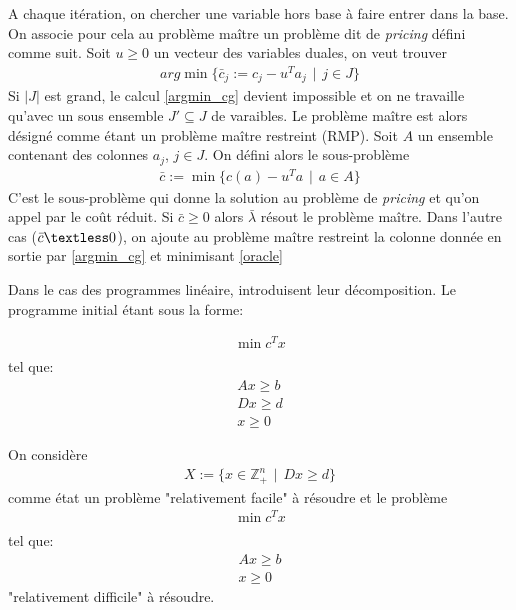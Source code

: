 \documentclass[12pt,a4paper,oneside]{book}
\theoremstyle{definition}
\newcommand{\Z}{\mathbb{Z}}
\begin{document}
			 A chaque itération, on chercher une variable hors base à faire entrer dans la base. On associe pour cela au problème maître un problème dit de \textit{pricing} défini comme suit.
			 Soit $u \geq 0$ un vecteur des variables duales, on veut trouver 
			 \begin{gather}\label{argmin_cg}
			     \textit{arg}\min \{ \bar{c}_j := c_j - u^T a_j \hspace{5pt} | \hspace{5pt} j \in J \}
			 \end{gather}
			 Si $|J|$ est grand, le calcul \ref{argmin_cg} devient impossible et on ne travaille qu'avec un sous ensemble $J' \subseteq J$ de varaibles. Le problème maître est alors désigné comme étant un problème maître restreint (RMP).  
			 Soit $A$ un ensemble contenant des colonnes $a_j$, $j \in J$. On défini alors le sous-problème
			 \begin{gather} \label{oracle}
			     \bar{c} := \min \{ c(a) - u^T a \hspace{5pt}| \hspace{5pt} a \in A \}
			 \end{gather}
			 C'est le sous-problème qui donne la solution au problème de \textit{pricing} et qu'on appel par le coût réduit. Si $\bar{c} \geq 0$ alors $\bar{\lambda}$ résout le problème maître. Dans l'autre cas ($\bar{c} \textless 0$), on ajoute au problème maître restreint la colonne donnée en sortie par \ref{argmin_cg} et minimisant \ref{oracle}
			 
			 Dans le cas des programmes linéaire, \cite{dantzig1960decomposition} introduisent leur décomposition. Le programme initial étant sous la forme:
			 
			 \begin{gather*}
			    \min c^T x \\
	        \end{gather*}
			tel que: 
			\begin{gather*}
			    Ax \geq b \\
			    Dx \geq d \\
			    x \geq 0
			\end{gather*}
			
			On considère 
			\begin{gather}\label{Xprob} 
			    X := \{ x \in \Z_+^n \hspace{5pt}|\hspace{5pt}Dx \geq d \}    
			\end{gather}
			comme état un problème "relativement facile" à résoudre et le problème
			 \begin{gather*} \label{MinProb}
			    \min c^T x \\
	        \end{gather*}
			tel que: 
			\begin{gather*}
			    Ax \geq b \\
			    x \geq 0
			\end{gather*}
			"relativement difficile" à résoudre.
			
\end{document}
